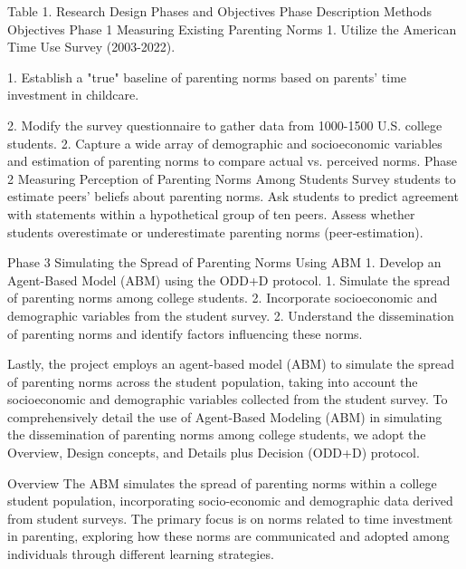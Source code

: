 Table 1.  Research Design Phases and Objectives
Phase	Description	Methods	Objectives
Phase 1	Measuring Existing Parenting Norms	1. Utilize the American Time Use Survey (2003-2022).

	1. Establish a "true" baseline of parenting norms based on parents' time investment in childcare.


		2. Modify the survey questionnaire to gather data from 1000-1500 U.S. college students.	2. Capture a wide array of demographic and socioeconomic variables and estimation of parenting norms to compare actual vs. perceived norms.
Phase 2	Measuring Perception of Parenting Norms Among Students	Survey students to estimate peers' beliefs about parenting norms. Ask students to predict agreement with statements within a hypothetical group of ten peers.	Assess whether students overestimate or underestimate parenting norms (peer-estimation).

Phase 3	Simulating the Spread of Parenting Norms Using ABM	1. Develop an Agent-Based Model (ABM) using the ODD+D protocol.	1. Simulate the spread of parenting norms among college students.
		2. Incorporate socioeconomic and demographic variables from the student survey.	2. Understand the dissemination of parenting norms and identify factors influencing these norms.

Lastly, the project employs an agent-based model (ABM) to simulate the spread of parenting norms across the student population, taking into account the socioeconomic and demographic variables collected from the student survey. To comprehensively detail the use of Agent-Based Modeling (ABM) in simulating the dissemination of parenting norms among college students, we adopt the Overview, Design concepts, and Details plus Decision (ODD+D) protocol. 

Overview
The ABM simulates the spread of parenting norms within a college student population, incorporating socio-economic and demographic data derived from student surveys. The primary focus is on norms related to time investment in parenting, exploring how these norms are communicated and adopted among individuals through different learning strategies.

